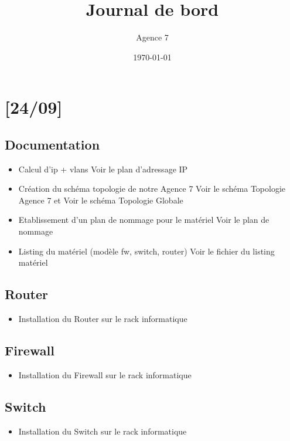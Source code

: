 \documentclass{article}
\title{Journal de bord}
\author{Agence 7}
\date{\today}
\begin{document}
\maketitle

\tableofcontents
\newpage

\section{[24/09]}

\subsection{Documentation}
\begin{itemize}
\item Calcul d'ip + vlans Voir le plan d'adressage IP
\item Création du schéma topologie de notre Agence 7 Voir le schéma Topologie Agence 7 et Voir le schéma Topologie Globale
\item Etablissement d'un plan de nommage pour le matériel Voir le plan de nommage
\item Listing du matériel (modèle fw, switch, router) Voir le fichier du listing matériel
\end{itemize}

\subsection{Router}
\begin{itemize}
\item Installation du Router sur le rack informatique
\end{itemize}

\subsection{Firewall}

\begin{itemize}
\item Installation du Firewall sur le rack informatique
\end{itemize}

\subsection{Switch}

\begin{itemize}
\item Installation du Switch sur le rack informatique
\end{itemize}
\end{document}
